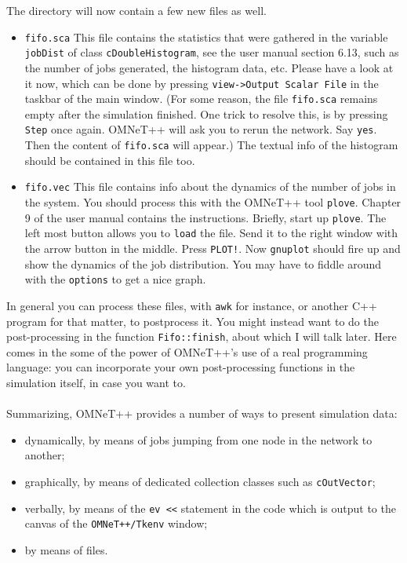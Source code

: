 \documentclass[a4paper]{article}
\begin{document}
The directory will now contain a few new files as well.
\begin{itemize}
\item \texttt{fifo.sca} This file contains the statistics that were
  gathered in the variable \texttt{jobDist} of class
  \texttt{cDoubleHistogram}, see the user manual section 6.13, such as
  the number of jobs generated, the histogram data, etc. Please have a
  look at it now, which can be done by pressing \texttt{view->Output
    Scalar File} in the taskbar of the main window. (For some reason,
  the file \texttt{fifo.sca} remains empty after the simulation
  finished. One trick to resolve this, is by pressing \texttt{Step}
  once again. OMNeT++ will ask you to rerun the network. Say
  \texttt{yes}. Then the content of \texttt{fifo.sca} will appear.)
  The textual info of the histogram should be contained in this file
  too.
\item \texttt{fifo.vec} This file contains info about the dynamics of
  the number of jobs in the system. You should process this with the
  OMNeT++ tool \texttt{plove}. Chapter 9 of the user manual contains
  the instructions.  Briefly, start up \texttt{plove}. The left most
  button allows you to \texttt{load} the file. Send it to the right
  window with the arrow button in the middle. Press \texttt{PLOT!}.
  Now \texttt{gnuplot} should fire up and show the dynamics of the job
  distribution. You may have to fiddle around with the
  \texttt{options} to get a nice graph.
\end{itemize}

In general you can process these files, with \texttt{awk} for instance,
or another C++ program for that matter, to postprocess it. You might
instead want to do the post-processing  in the function
\texttt{Fifo::finish}, about which I will talk later. Here comes in
the some of the power of OMNeT++'s use of   a real programming language:
you can incorporate your own post-processing functions in the
simulation itself, in case you want to.

\paragraph{}
Summarizing, OMNeT++ provides a number of ways to present simulation
data:
\begin{itemize}
\item dynamically, by means of jobs jumping from one node in the
  network to another;
\item graphically, by means of dedicated collection classes such as
  \texttt{cOutVector};
\item verbally, by means of the \texttt{ev <<} statement in the code
  which is output to the  canvas of the \texttt{OMNeT++/Tkenv} window;
\item by means of files.
\end{itemize}
\end{document}

